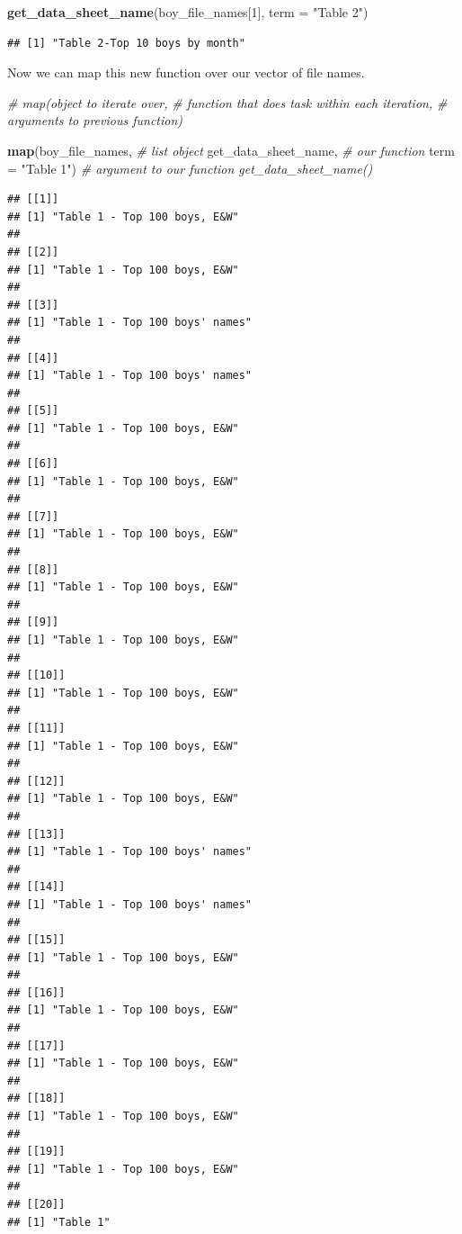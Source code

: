 \documentclass[
]{book}
\newenvironment{Shaded}{\begin{snugshade}}{\end{snugshade}}
\newcommand{\CommentTok}[1]{\textcolor[rgb]{0.56,0.35,0.01}{\textit{#1}}}
\newcommand{\DataTypeTok}[1]{\textcolor[rgb]{0.13,0.29,0.53}{#1}}
\newcommand{\DecValTok}[1]{\textcolor[rgb]{0.00,0.00,0.81}{#1}}
\newcommand{\KeywordTok}[1]{\textcolor[rgb]{0.13,0.29,0.53}{\textbf{#1}}}
\newcommand{\NormalTok}[1]{#1}
\newcommand{\StringTok}[1]{\textcolor[rgb]{0.31,0.60,0.02}{#1}}
\begin{document}
\begin{Shaded}
\begin{Highlighting}[]
\KeywordTok{get\_data\_sheet\_name}\NormalTok{(boy\_file\_names[}\DecValTok{1}\NormalTok{], }\DataTypeTok{term =} \StringTok{"Table 2"}\NormalTok{)}
\end{Highlighting}
\end{Shaded}

\begin{verbatim}
## [1] "Table 2-Top 10 boys by month"
\end{verbatim}

Now we can map this new function over our vector of file names.

\begin{Shaded}
\begin{Highlighting}[]
\CommentTok{\# map(object to iterate over, }
\CommentTok{\#     function that does task within each iteration, }
\CommentTok{\#     arguments to previous function)}
 
\KeywordTok{map}\NormalTok{(boy\_file\_names,      }\CommentTok{\# list object}
\NormalTok{    get\_data\_sheet\_name, }\CommentTok{\# our function}
    \DataTypeTok{term =} \StringTok{"Table 1"}\NormalTok{)    }\CommentTok{\# argument to our function \textasciigrave{}get\_data\_sheet\_name()\textasciigrave{}}
\end{Highlighting}
\end{Shaded}

\begin{verbatim}
## [[1]]
## [1] "Table 1 - Top 100 boys, E&W"
## 
## [[2]]
## [1] "Table 1 - Top 100 boys, E&W"
## 
## [[3]]
## [1] "Table 1 - Top 100 boys' names"
## 
## [[4]]
## [1] "Table 1 - Top 100 boys' names"
## 
## [[5]]
## [1] "Table 1 - Top 100 boys, E&W"
## 
## [[6]]
## [1] "Table 1 - Top 100 boys, E&W"
## 
## [[7]]
## [1] "Table 1 - Top 100 boys, E&W"
## 
## [[8]]
## [1] "Table 1 - Top 100 boys, E&W"
## 
## [[9]]
## [1] "Table 1 - Top 100 boys, E&W"
## 
## [[10]]
## [1] "Table 1 - Top 100 boys, E&W"
## 
## [[11]]
## [1] "Table 1 - Top 100 boys, E&W"
## 
## [[12]]
## [1] "Table 1 - Top 100 boys, E&W"
## 
## [[13]]
## [1] "Table 1 - Top 100 boys' names"
## 
## [[14]]
## [1] "Table 1 - Top 100 boys' names"
## 
## [[15]]
## [1] "Table 1 - Top 100 boys, E&W"
## 
## [[16]]
## [1] "Table 1 - Top 100 boys, E&W"
## 
## [[17]]
## [1] "Table 1 - Top 100 boys, E&W"
## 
## [[18]]
## [1] "Table 1 - Top 100 boys, E&W"
## 
## [[19]]
## [1] "Table 1 - Top 100 boys, E&W"
## 
## [[20]]
## [1] "Table 1"
\end{verbatim}
\end{document}
